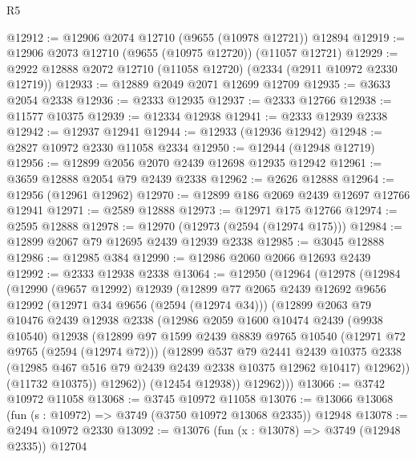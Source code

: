 \begin{lexlean}{R5}
\begin{coremodule}
@12912 := @12906 @2074 @12710 (@9655 (@10978 @12721)) @12894
@12919 := @12906 @2073 @12710 (@9655 (@10975 @12720)) (@11057 @12721)
@12929 := @2922 @12888 @2072 @12710 (@11058 @12720) (@2334 (@2911 @10972 @2330 @12719))
@12933 := @12889 @2049 @2071 @12699 @12709
@12935 := @3633 @2054 @2338
@12936 := @2333 @12935
@12937 := @2333 @12766
@12938 := @11577 @10375
@12939 := @12334 @12938
@12941 := @2333 @12939 @2338
@12942 := @12937 @12941
@12944 := @12933 (@12936 @12942)
@12948 := @2827 @10972 @2330 @11058 @2334
@12950 := @12944 (@12948 @12719)
@12956 := @12899 @2056 @2070 @2439 @12698 @12935 @12942
@12961 := @3659 @12888 @2054 @79 @2439 @2338
@12962 := @2626 @12888
@12964 := @12956 (@12961 @12962)
@12970 := @12899 @186 @2069 @2439 @12697 @12766 @12941
@12971 := @2589 @12888
@12973 := @12971 @175 @12766
@12974 := @2595 @12888
@12978 := @12970 (@12973 (@2594 (@12974 @175)))
@12984 := @12899 @2067 @79 @12695 @2439 @12939 @2338
@12985 := @3045 @12888
@12986 := @12985 @384
@12990 := @12986 @2060 @2066 @12693 @2439
@12992 := @2333 @12938 @2338
@13064 := @12950
    (@12964
      (@12978
        (@12984
          (@12990
            (@9657 @12992)
            @12939
            (@12899
              @77
              @2065
              @2439
              @12692
              @9656
              @12992
              (@12971 @34 @9656 (@2594 (@12974 @34)))
              (@12899
                @2063
                @79
                @10476
                @2439
                @12938
                @2338
                (@12986
                  @2059
                  @1600
                  @10474
                  @2439
                  (@9938 @10540)
                  @12938
                  (@12899
                    @97
                    @1599
                    @2439
                    @8839
                    @9765
                    @10540
                    (@12971 @72 @9765 (@2594 (@12974 @72)))
                    (@12899
                      @537
                      @79
                      @2441
                      @2439
                      @10375
                      @2338
                      (@12985 @467 @516 @79 @2439 @2439 @2338 @10375 @12962 @10417)
                      @12962))
                  (@11732 @10375))
                @12962))
            (@12454 @12938))
          @12962)))
@13066 := @3742 @10972 @11058
@13068 := @3745 @10972 @11058
@13076 := @13066 @13068 (fun (s : @10972) => @3749 (@3750 @10972 @13068 @2335)) @12948
@13078 := @2494 @10972 @2330
@13092 := @13076
    (fun (x : @13078) => @3749 (@12948 @2335))
    @12704

\end{coremodule}
\end{lexlean}
